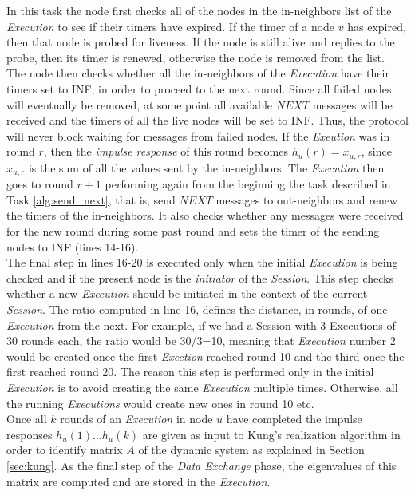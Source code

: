 \documentclass[a4paper,11pt,twoside]{report}
\begin{document}
In this task the node first checks all of the nodes in the in-neighbors list of the \textit{Execution} to see if their timers have expired. If the timer of a node $v$ has expired, then that node is probed for liveness. If the node is still alive and replies to the probe, then its timer is renewed, otherwise the node is removed from the list.\\



The node then checks whether all the in-neighbors of the \textit{Execution} have their timers set to INF, in order to proceed to the next round. Since all failed nodes will eventually be removed, at some point all available $NEXT$ messages will be received and the timers of all the live nodes will be set to INF. Thus, the protocol will never block waiting for messages from failed nodes. If the \textit{Exeution} was in round $r$, then the \textit{impulse response} of this round becomes $h_u(r)=x_{u,r}$, since $x_{u,r}$ is the sum of all the values sent by the in-neighbors. The \textit{Execution} then goes to round $r+1$ performing again from the beginning the task described in Task \ref{alg:send_next}, that is, send $NEXT$ messages to out-neighbors and renew the timers of the in-neighbors. It also checks whether any messages were received for the new round during some past round and sets the timer of the sending nodes to INF (lines 14-16).\\

The final step in lines 16-20 is executed only when the initial \textit{Execution} is being checked and if the present node is the \textit{initiator} of the \textit{Session}. This step checks whether a new \textit{Execution} should be initiated in the context of the current \textit{Session}. The ratio computed in line 16, defines the distance, in rounds, of one \textit{Execution} from the next. For example, if we had a Session with 3 Executions of 30 rounds each, the ratio would be 30/3=10, meaning that \textit{Execution} number 2 would be created once the first \textit{Exection} reached round 10 and the third once the first reached round 20. The reason this step is performed only in the initial \textit{Execution} is to avoid creating the same \textit{Execution} multiple times. Otherwise, all the running \textit{Executions} would create new ones in round 10 etc.\\



Once all $k$ rounds of an \textit{Execution} in node $u$ have completed the impulse responses $h_u(1)\dots h_u(k)$ are given as input to Kung's realization algorithm in order to identify matrix $A$ of the dynamic system as explained in Section \ref{sec:kung}. As the final step of the \textit{Data Exchange} phase, the eigenvalues of this matrix are computed and are stored in the \textit{Execution}.
\end{document}
